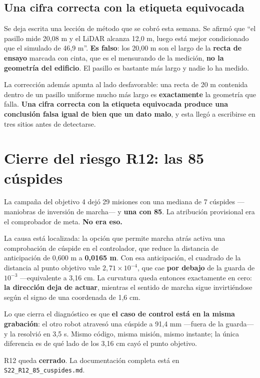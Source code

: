 \documentclass[12pt,letterpaper]{article}
\begin{document}
\subsection{Una cifra correcta con la etiqueta equivocada}

Se deja escrita una lección de método que se cobró esta semana. Se afirmó que ``el pasillo mide 20,08 m y el LiDAR alcanza 12,0 m, luego está mejor condicionado que el simulado de 46,9 m''. \textbf{Es falso}: los 20,00 m son el largo de la \textbf{recta de ensayo} marcada con cinta, que es el mensurando de la medición, \textbf{no la geometría del edificio}. El pasillo es bastante más largo y nadie lo ha medido.

La corrección además apunta al lado desfavorable: una recta de 20 m contenida dentro de un pasillo uniforme mucho más largo es \textbf{exactamente} la geometría que falla. \textbf{Una cifra correcta con la etiqueta equivocada produce una conclusión falsa igual de bien que un dato malo}, y esta llegó a escribirse en tres sitios antes de detectarse.

\section{Cierre del riesgo R12: las 85 cúspides}
\label{sec:r12}

La campaña del objetivo 4 dejó 29 misiones con una mediana de 7 cúspides ---maniobras de inversión de marcha--- y \textbf{una con 85}. La atribución provisional era el comprobador de meta. \textbf{No era eso.}

La causa está localizada: la opción que permite marcha atrás activa una comprobación de cúspide en el controlador, que reduce la distancia de anticipación de 0,600 m a \textbf{0,0165 m}. Con esa anticipación, el cuadrado de la distancia al punto objetivo vale $2{,}71 \times 10^{-4}$, que cae \textbf{por debajo} de la guarda de $10^{-3}$ ---equivalente a 3,16 cm. La curvatura queda entonces exactamente en cero: \textbf{la dirección deja de actuar}, mientras el sentido de marcha sigue invirtiéndose según el signo de una coordenada de 1,6 cm.

Lo que cierra el diagnóstico es que \textbf{el caso de control está en la misma grabación}: el otro robot atravesó una cúspide a 91,4 mm ---fuera de la guarda--- y la resolvió en 3,5 s. Mismo código, misma misión, mismo instante; la única diferencia es de qué lado de los 3,16 cm cayó el punto objetivo.

R12 queda \textbf{cerrado}. La documentación completa está en \texttt{S22\_R12\_85\_cuspides.md}.
\end{document}
